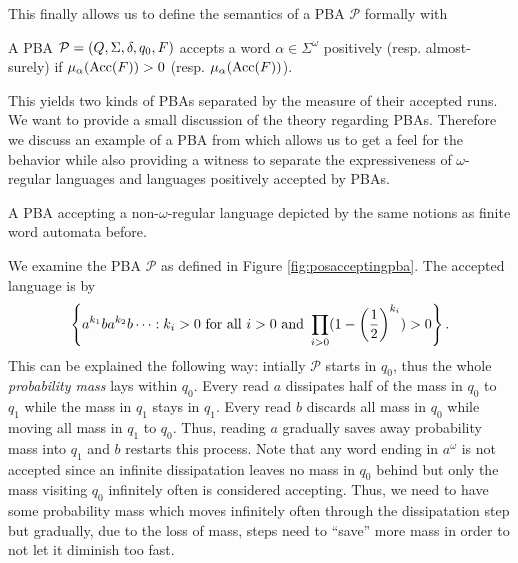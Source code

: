This finally allows us to define the semantics of a \ac{PBA} $\mathcal{P}$
formally with
\begin{definition}
  A \ac{PBA} $\mathcal{P} = \left(Q, \Sigma, \delta, q_{0}, F\right)$ accepts a word 
  $\alpha\in\Sigma^{\omega}$ positively (resp. almost-surely) if
  $\mu_{\alpha}(\operatorname{Acc}(F)) > 0$ (resp. $\mu_{\alpha}(\operatorname{Acc}(F))$).
\end{definition}
This yields two kinds of \acp{PBA} separated by the measure of their accepted 
runs. We want to provide a small discussion of the theory regarding \acp{PBA}.
Therefore we discuss an example of a \ac{PBA} from \cite{RecOmeLangProbAuto} 
which allows us to get a feel for the behavior while also providing a witness 
to separate the expressiveness of $\omega$-regular languages and languages 
positively accepted by \acp{PBA}.
\begin{drawing}
  \caption{A \ac{PBA} accepting a non-$\omega$-regular language depicted by the
  same notions as finite word automata before.}
  \label{fig:posacceptingpba}
  \begin{center}
  \end{center}
\end{drawing}
\begin{example}
  We examine the \ac{PBA} $\mathcal{P}$ as defined in Figure 
  \ref{fig:posacceptingpba}. The accepted language is by 
  \cite{RecOmeLangProbAuto}
  \begin{equation*}
    \left\{a^{k_{1}}ba^{k_{2}}b\dots:k_{i}>0\text{ for all }i>0\text{ and }
    \prod_{i>0}(1-\left(\frac{1}{2}\right)^{k_{i}}) > 0\right\}.
  \end{equation*}
  This can be explained the following way: intially $\mathcal{P}$ starts in 
  $q_{0}$, thus the whole \emph{probability mass} lays within $q_{0}$. Every
  read $a$ dissipates half of the mass in $q_{0}$ to $q_{1}$ while the mass in
  $q_{1}$ stays in $q_{1}$. Every read $b$ discards all mass in $q_{0}$ while
  moving all mass in $q_{1}$ to $q_{0}$. Thus, reading $a$ gradually saves away
  probability mass into $q_{1}$ and $b$ restarts this process. Note that any 
  word ending in $a^{\omega}$ is not accepted since an infinite dissipatation 
  leaves no mass in $q_{0}$ behind but only the mass visiting $q_{0}$ 
  infinitely often is considered accepting. Thus, we need to have some 
  probability mass which moves infinitely often through the dissipatation step 
  but gradually, due to the loss of mass, steps need to \enquote{save} more 
  mass in order to not let it diminish too fast.
  \label{ex:posacceptingpba}
\end{example}
